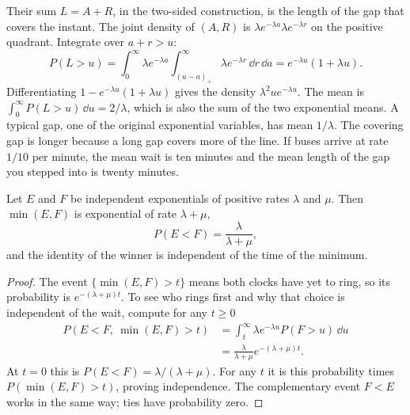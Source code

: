 Their sum $L=A+R$, in the two-sided construction, is the length of the gap that covers the instant. The joint density of $(A,R)$ is $\lambda e^{-\lambda a}\lambda e^{-\lambda r}$ on the positive quadrant. Integrate over $a+r>u$:
\[
 P(L>u)=\int_0^\infty\lambda e^{-\lambda a}\int_{(u-a)_+}^\infty\lambda e^{-\lambda r}\,\dd r\,\dd a=e^{-\lambda u}(1+\lambda u).
\]
Differentiating $1-e^{-\lambda u}(1+\lambda u)$ gives the density $\lambda^2 u e^{-\lambda u}$. The mean is $\int_0^\infty P(L>u)\,\dd u=2/\lambda$, which is also the sum of the two exponential means. A typical gap, one of the original exponential variables, has mean $1/\lambda$. The covering gap is longer because a long gap covers more of the line. If buses arrive at rate $1/10$ per minute, the mean wait is ten minutes and the mean length of the gap you stepped into is twenty minutes.

\begin{proposition}\label{prop:race}
Let $E$ and $F$ be independent exponentials of positive rates $\lambda$ and $\mu$. Then $\min(E,F)$ is exponential of rate $\lambda+\mu$,
\[
P(E<F)=\frac{\lambda}{\lambda+\mu},
\]
and the identity of the winner is independent of the time of the minimum.
\end{proposition}
\begin{proof}
The event $\{\min(E,F)>t\}$ means both clocks have yet to ring, so its probability is $e^{-(\lambda+\mu)t}$. To see who rings first and why that choice is independent of the wait, compute for any $t\ge0$
\[
\begin{aligned}
P(E<F,\ \min(E,F)>t)
 &=\int_t^\infty \lambda e^{-\lambda u}P(F>u)\,\dd u\\
 &=\frac{\lambda}{\lambda+\mu}e^{-(\lambda+\mu)t}.
\end{aligned}
\]
At $t=0$ this is $P(E<F)=\lambda/(\lambda+\mu)$. For any $t$ it is this probability times $P(\min(E,F)>t)$, proving independence. The complementary event $F<E$ works in the same way; ties have probability zero.
\end{proof}

